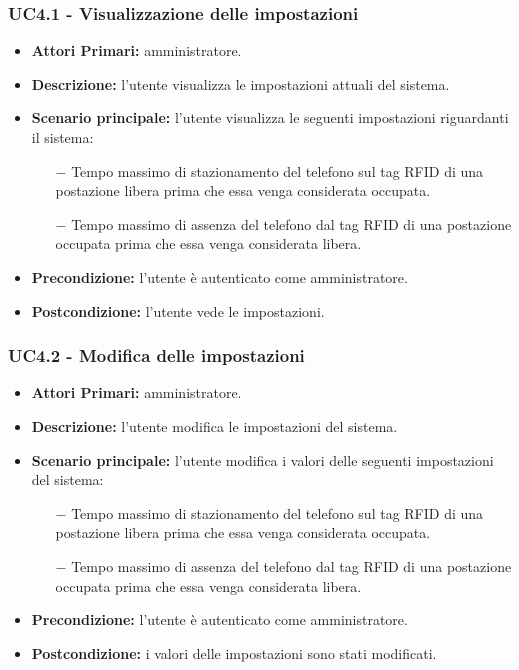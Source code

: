 \subsubsection{ UC4.1 - Visualizzazione delle impostazioni}
\begin{itemize}
	\item\textbf{Attori Primari:} 
	amministratore.
	\item\textbf{Descrizione:} 
	l'utente visualizza le impostazioni attuali del sistema.
	\item\textbf{Scenario principale:} 
	l'utente visualizza le seguenti impostazioni riguardanti il sistema:
	\begin{itemize}
		\item[$-$] Tempo massimo di stazionamento del telefono sul tag RFID di una postazione libera prima che essa venga considerata occupata.
		\item[$-$] Tempo massimo di assenza del telefono dal tag RFID di una postazione occupata prima che essa venga considerata libera.
	\end{itemize}
	\item\textbf{Precondizione:} 
	l'utente è autenticato come amministratore.
	\item\textbf{Postcondizione:}
	l'utente vede le impostazioni.
\end{itemize}

\subsubsection{ UC4.2 - Modifica delle impostazioni}
\begin{itemize}
	\item\textbf{Attori Primari:} 
	amministratore.
	\item\textbf{Descrizione:} 
	l'utente modifica le impostazioni del sistema.
	\item\textbf{Scenario principale:} 
	l'utente modifica i valori delle seguenti impostazioni del sistema:
	\begin{itemize}
		\item[$-$] Tempo massimo di stazionamento del telefono sul tag RFID di una postazione libera prima che essa venga considerata occupata.
		\item[$-$] Tempo massimo di assenza del telefono dal tag RFID di una postazione occupata prima che essa venga considerata libera.
	\end{itemize}
	\item\textbf{Precondizione:} 
	l'utente è autenticato come amministratore.
	\item\textbf{Postcondizione:}
	i valori delle impostazioni sono stati modificati.
\end{itemize}

